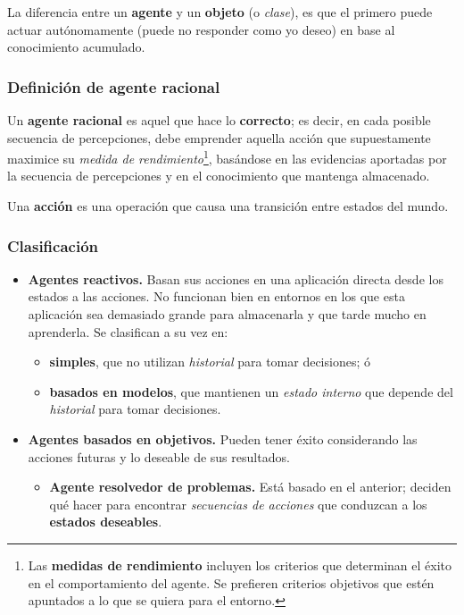 \documentclass[10pt,a4paper]{article}
\begin{document}
La diferencia entre un \textbf{agente} y un \textbf{objeto} (o \textit{clase}), es que el primero puede actuar autónomamente (puede no responder como yo deseo) en base al conocimiento acumulado.

\subsubsection{Definición de agente racional}

Un \textbf{agente racional} es aquel que hace lo \textbf{correcto}; es decir, en cada posible secuencia de percepciones, debe emprender aquella acción que supuestamente maximice su \textit{medida de rendimiento}\footnote{Las \textbf{medidas de rendimiento} incluyen los criterios que determinan el éxito en el comportamiento del agente. Se prefieren criterios objetivos que estén apuntados a lo que se quiera para el entorno.}, basándose en las evidencias aportadas por la secuencia de percepciones y en el conocimiento que mantenga almacenado.

Una \textbf{acción} es una operación que causa una transición entre estados del mundo.

\subsubsection{Clasificación}

\begin{itemize}
\item \textbf{Agentes reactivos.} Basan sus acciones en una aplicación directa desde los estados a las acciones. No funcionan bien en entornos en los que esta aplicación sea demasiado grande para almacenarla y que tarde mucho en aprenderla. Se clasifican a su vez en:
\begin{itemize}
\item \textbf{simples}, que no utilizan \textit{historial} para tomar decisiones; ó \item \textbf{basados en modelos}, que mantienen un \textit{estado interno} que depende del \textit{historial} para tomar decisiones.
\end{itemize} 
\item \textbf{Agentes basados en objetivos.} Pueden tener éxito considerando las acciones futuras y lo deseable de sus resultados.
\begin{itemize}
\item \textbf{Agente resolvedor de problemas.} Está basado en el anterior; deciden qué hacer para encontrar \textit{secuencias de acciones} que conduzcan a los \textbf{estados deseables}.
\end{itemize}
\end{itemize}
\end{document}
